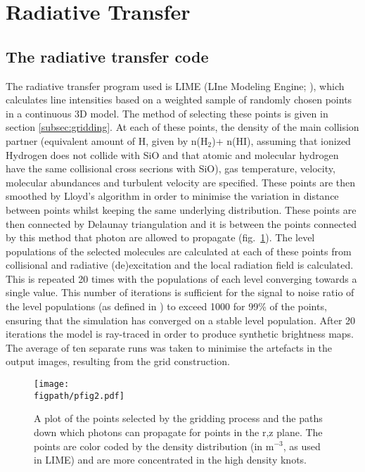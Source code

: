 \documentclass[useAMS,usenatbib]{mn2e}
\newcommand{\figpath}{../NEWFIGS}
\begin{document}
\section{Radiative Transfer}
\label{sec:radtrans}

\subsection{The radiative transfer code} \label{subsec:radiative_transfer_code}
The radiative transfer program used is LIME (LIne Modeling Engine;
\citealt{Brinch:2010p13078}), which  calculates line intensities based
on a weighted sample of randomly chosen points in a continuous 3D
model. The method of selecting these points is given in section
\ref{subsec:gridding}. At each of these points, the density of the
main collision partner (equivalent amount of H, given by n(H$_2$)+
n(HI), assuming that ionized Hydrogen does not collide with SiO and that atomic and molecular hydrogen have the same collisional cross secrions with SiO), gas temperature, velocity, molecular abundances and turbulent velocity are specified. These points are then smoothed by Lloyd's algorithm \citep{Lloyd1982} in order to minimise the variation in distance between points whilst keeping the same underlying distribution. These points are then connected by Delaunay triangulation and it is between the points connected by this method that photon are allowed to propagate (fig.~\ref{grid}). The level populations of the selected molecules are calculated at each of these points from collisional and radiative (de)excitation and the local radiation field is calculated. This is repeated 20 times with the populations of each level converging towards a single value. This number of iterations is sufficient for the signal to noise ratio of the level populations (as defined in \citealt{Brinch:2010p13078}) to exceed 1000 for 99\% of the points, ensuring that the simulation has converged on a stable level population. After 20 iterations the model is ray-traced in order to produce synthetic brightness maps. The average of ten separate runs was taken to minimise the artefacts in the output images, resulting from the grid construction.%


\begin{figure}
 \texttt{[image: \\figpath/pfig2.pdf]}%
 \caption{A plot of the points selected by the gridding process and the paths down which photons can propagate for points in the r,z plane. The points are color coded by the density distribution (in m$^{-3}$, as used in LIME) and are more concentrated in the high density knots.}
\label{grid} %
\end{figure}
\end{document}
